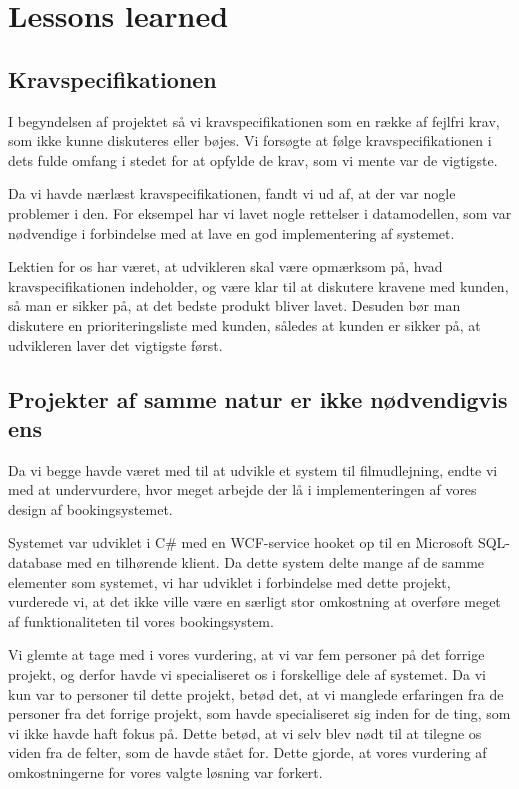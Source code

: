 \chapter{Lessons learned}
\label{Conclusion_Lessons}
\section{Kravspecifikationen}
\label{Lessons_Krav}
I begyndelsen af projektet så vi kravspecifikationen som en række af fejlfri krav, som ikke kunne diskuteres eller bøjes. Vi forsøgte at følge kravspecifikationen i dets fulde omfang i stedet for at opfylde de krav, som vi mente var de vigtigste.

Da vi havde nærlæst kravspecifikationen, fandt vi ud af, at der var nogle problemer i den. For eksempel har vi lavet nogle rettelser i datamodellen, som var nødvendige i forbindelse med at lave en god implementering af systemet.

Lektien for os har været, at udvikleren skal være opmærksom på, hvad kravspecifikationen indeholder, og være klar til at diskutere kravene med kunden, så man er sikker på, at det bedste produkt bliver lavet. Desuden bør man diskutere en prioriteringsliste med kunden, således at kunden er sikker på, at udvikleren laver det vigtigste først.

\section{Projekter af samme natur er ikke nødvendigvis ens}
\label{Lessons_Projekt}
Da vi begge havde været med til at udvikle et system til filmudlejning, endte vi med at undervurdere, hvor meget arbejde der lå i implementeringen af vores design af bookingsystemet.

Systemet var udviklet i C\# med en WCF-service hooket op til en Microsoft SQL-database med en tilhørende klient. Da dette system delte mange af de samme elementer som systemet, vi har udviklet i forbindelse med dette projekt, vurderede vi, at det ikke ville være en særligt stor omkostning at overføre meget af funktionaliteten til vores bookingsystem.

Vi glemte at tage med i vores vurdering, at vi var fem personer på det forrige projekt, og derfor havde vi specialiseret os i forskellige dele af systemet. Da vi kun var to personer til dette projekt, betød det, at vi manglede erfaringen fra de personer fra det forrige projekt, som havde specialiseret sig inden for de ting, som vi ikke havde haft fokus på. Dette betød, at vi selv blev nødt til at tilegne os viden fra de felter, som de havde stået for. Dette gjorde, at vores vurdering af omkostningerne for vores valgte løsning var forkert.

